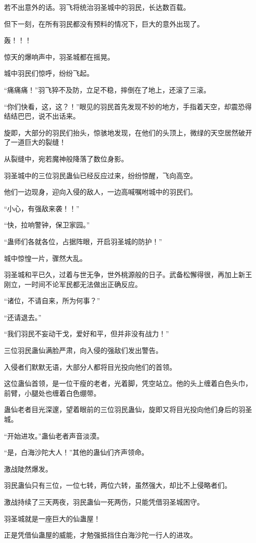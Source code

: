\begin{this_body}
若不出意外的话。羽飞将统治羽圣城中的羽民，长达数百载。

但下一刻，在所有羽民都没有预料的情况下，巨大的意外出现了。

轰！！！

惊天的爆响声中，羽圣城都在摇晃。

城中羽民们惊呼，纷纷飞起。

“痛痛痛！”羽飞猝不及防，立足不稳，摔倒在了地上，还滚了三滚。

“你们快看，这，这？！”眼见的羽民首先发现不妙的地方，手指着天空，却震恐得结结巴巴，说不出话来。

旋即，大部分的羽民们抬头，惊骇地发现，在他们的头顶上，微绿的天空居然破开了一道巨大的裂缝！

从裂缝中，宛若魔神般降落了数位身影。

羽圣城中的三位羽民蛊仙已经反应过来，纷纷惊醒，飞向高空。

他们一边现身，迎向入侵的敌人，一边高喊嘱咐城中的羽民们。

“小心，有强敌来袭！！”

“快，拉响警钟，保卫家园。”

“蛊师们各就各位，占据阵眼，开启羽圣城的防护！”

城中惊惶一片，骤然大乱。

羽圣城和平已久，过着与世无争，世外桃源般的日子。武备松懈得很，再加上新王刚立，一时间不论军民都无法做出正确反应。

“诸位，不请自来，所为何事？”

“还请退去。”

“我们羽民不妄动干戈，爱好和平，但并非没有战力！”

三位羽民蛊仙满脸严肃，向入侵的强敌们发出警告。

入侵者们默默无语，大部分人都将目光投向他们的首领。

这位蛊仙首领，是一位干瘦的老者，光着脚，凭空站立。他的头上缠着白色头巾，前臂，小腿处也缠着白色绷带。

蛊仙老者目光深邃，望着眼前的三位羽民蛊仙，旋即又将目光投向他们身后的羽圣城。

“开始进攻。”蛊仙老者声音淡漠。

“是，白海沙陀大人！”其他的蛊仙们齐声领命。

激战陡然爆发。

羽民蛊仙只有三位，一位七转，两位六转，虽然强大，却比不上侵略者们。

激战持续了三天两夜，羽民蛊仙一死两伤，只能凭借羽圣城困守。

羽圣城就是一座巨大的仙蛊屋！

正是凭借仙蛊屋的威能，才勉强抵挡住白海沙陀一行人的进攻。

\end{this_body}


